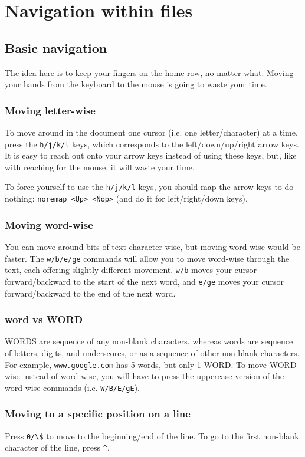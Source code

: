 \chapter{Navigation within files}

\section{Basic navigation}

The idea here is to keep your fingers on the home row, no matter what.
Moving your hands from the keyboard to the mouse is going to waste your time.

\subsection{Moving letter-wise}

To move around in the document one cursor (i.e. one letter/character) at a time, press the \verb|h/j/k/l| keys, which corresponds to the left/down/up/right arrow keys.
It is easy to reach out onto your arrow keys instead of using these keys, but, like with reaching for the mouse, it will waste your time.

To force yourself to use the \verb|h/j/k/l| keys, you should map the arrow keys to do nothing: \verb|noremap <Up> <Nop>| (and do it for left/right/down keys).

\subsection{Moving word-wise}

You can move around bits of text character-wise, but moving word-wise would be faster.
The \verb|w/b/e/ge| commands will allow you to move word-wise through the text, each offering slightly different movement.
\verb|w/b| moves your cursor forward/backward to the start of the next word, and \verb|e/ge| moves your cursor forward/backward to the end of the next word.

\subsection{word vs WORD}

WORDS are sequence of any non-blank characters, whereas words are sequence of letters, digits, and underscores, or as a sequence of other non-blank characters.
For example, \verb|www.google.com| has 5 words, but only 1 WORD.
To move WORD-wise instead of word-wise, you will have to press the uppercase version of the word-wise commands (i.e. \verb|W/B/E/gE|).

\subsection{Moving to a specific position on a line}

Press \verb|0/\$| to move to the beginning/end of the line.
To go to the first non-blank character of the line, press \verb|^|.
